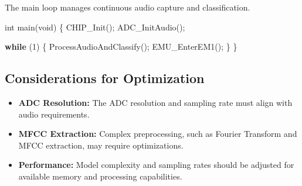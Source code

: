 \documentclass[
  9pt,
  letterpaper,
  abstract,
  titlepage]{scrbook}
\newenvironment{Shaded}{\begin{snugshade}}{\end{snugshade}}
\newcommand{\ControlFlowTok}[1]{\textcolor[rgb]{0.00,0.23,0.31}{\textbf{#1}}}
\newcommand{\DataTypeTok}[1]{\textcolor[rgb]{0.68,0.00,0.00}{#1}}
\newcommand{\DecValTok}[1]{\textcolor[rgb]{0.68,0.00,0.00}{#1}}
\newcommand{\NormalTok}[1]{\textcolor[rgb]{0.00,0.23,0.31}{#1}}
\newcommand{\OperatorTok}[1]{\textcolor[rgb]{0.37,0.37,0.37}{#1}}
\begin{document}
The main loop manages continuous audio capture and classification.

\begin{Shaded}
\begin{Highlighting}[]
\DataTypeTok{int}\NormalTok{ main}\OperatorTok{(}\DataTypeTok{void}\OperatorTok{)} \OperatorTok{\{}
\NormalTok{    CHIP\_Init}\OperatorTok{();}
\NormalTok{    ADC\_InitAudio}\OperatorTok{();}

    \ControlFlowTok{while} \OperatorTok{(}\DecValTok{1}\OperatorTok{)} \OperatorTok{\{}
\NormalTok{        ProcessAudioAndClassify}\OperatorTok{();}
\NormalTok{        EMU\_EnterEM1}\OperatorTok{();}
    \OperatorTok{\}}
\OperatorTok{\}}
\end{Highlighting}
\end{Shaded}

\subsection{Considerations for
Optimization}\label{considerations-for-optimization}

\begin{itemize}
\item
  \textbf{ADC Resolution:} The ADC resolution and sampling rate must
  align with audio requirements.
\item
  \textbf{MFCC Extraction:} Complex preprocessing, such as Fourier
  Transform and MFCC extraction, may require optimizations.
\item
  \textbf{Performance:} Model complexity and sampling rates should be
  adjusted for available memory and processing capabilities.
\end{itemize}


\backmatter
\end{document}
